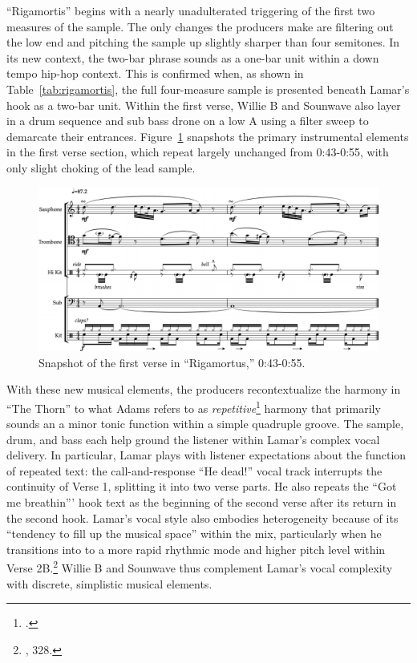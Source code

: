 ``Rigamortis'' begins with a nearly unadulterated triggering of the first two measures of the sample. The only changes the producers make are filtering out the low end and pitching the sample up slightly sharper than four semitones. In its new context, the two-bar phrase sounds as a one-bar unit within a down tempo hip-hop context. This is confirmed when, as shown in Table~\ref{tab:rigamortis}, the full four-measure sample is presented beneath Lamar's hook as a two-bar unit. Within the first verse, Willie B and Sounwave also layer in a drum sequence and sub bass drone on a low A using a filter sweep to demarcate their entrances. Figure~\ref{fig:rigamortisnoslip} snapshots the primary instrumental elements in the first verse section, which repeat largely unchanged from 0:43-0:55, with only slight choking of the lead sample.

\begin{figure}[ht]
    \centering
    \includegraphics[width=\textwidth]{images/figures/chp 02/043053rigamortusnoslip.pdf}
    \caption{Snapshot of the first verse in ``Rigamortus,'' 0:43-0:55.}
    \label{fig:rigamortisnoslip}
\end{figure}

With these new musical elements, the producers recontextualize the harmony in ``The Thorn'' to what Adams refers to as \emph{repetitive}\footnote{\cite{kyleadamsMetricalTechniquesFlow2009}.} harmony that primarily sounds an a minor tonic function within a simple quadruple groove. The sample, drum, and bass each help ground the listener within Lamar's complex vocal delivery. In particular, Lamar plays with listener expectations about the function of repeated text: the call-and-response ``He dead!'' vocal track interrupts the continuity of Verse 1, splitting it into two verse parts. He also repeats the ``Got me breathin''' hook text as the beginning of the second verse after its return in the second hook. Lamar's vocal style also embodies heterogeneity because of its ``tendency to fill up the musical space'' within the mix, particularly when he transitions into to a more rapid rhythmic mode and higher pitch level within Verse 2B.\footnote{\cite{ollywilsonHeterogeneousSoundIdeal1992}, 328.} Willie B and Sounwave thus complement Lamar's vocal complexity with discrete, simplistic musical elements.



